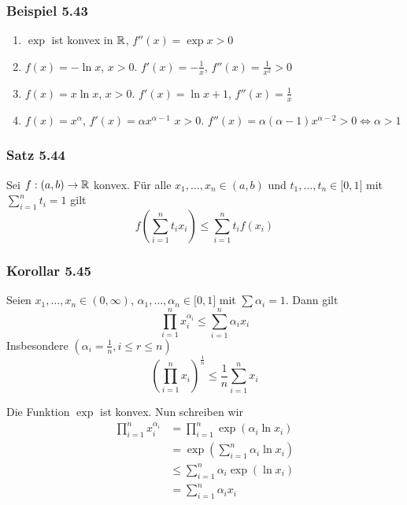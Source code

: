 \subsubsection*{Beispiel 5.43}
\begin{enumerate}
\item $\exp$ ist konvex in $\mathbb{R}$, $f''(x)=\exp x>0$
\item $f(x)=-\ln x$, $x>0$. $f'(x)=-\frac{1}{x}$, $f''(x)=\frac{1}{x^2}>0$
\item $f(x)=x\ln x$, $x>0$. $f'(x)=\ln x +1$, $f''(x)=\frac{1}{x}$
\item $f(x)=x^\alpha $, $f'(x)=\alpha x^{\alpha-1}$ $x>0$. $f''(x)=\alpha(\alpha-1)x^{\alpha-2}>0\Leftrightarrow \alpha >1$
\end{enumerate}

\subsubsection*{Satz 5.44}
Sei $f:(a,b)\to\mathbb{R}$ konvex. Für alle $x_1,\dots,x_n\in(a,b)$ und $t_1,\dots,t_n\in\lbrack 0,1\rbrack$ mit $\sum\limits_{i=1}^n t_i=1$ gilt
\[f\left( \sum\limits_{i=1}^n t_ix_i\right)\leq  \sum\limits_{i=1}^n t_if(x_i)\]

\subsubsection*{Korollar 5.45}
Seien $x_1,\dots, x_n\in (0,\infty)$, $\alpha_1,\dots,\alpha_n\in\lbrack 0,1\rbrack$ mit $\sum\alpha_i=1$. Dann gilt 
\[\prod\limits_{i = 1}^n {x_i^{{\alpha _i}}}  \le \sum\limits_{i = 1}^n {{\alpha _i}{x_i}} \]
Insbesondere $\left( \alpha_i=\frac{1}{n}, i\leq r\leq n\right)$
\[{\left( {\prod\limits_{i = 1}^n {{x_i}} } \right)^{\frac{1}{n}}} \le \frac{1}{n}\sum\limits_{i = 1}^n {{x_i}} \]

\begin{beweis}{}
Die Funktion $\exp$ ist konvex. Nun schreiben wir
\begin{align*}
\prod\limits_{i = 1}^n {x_i^{{\alpha _i}}}  &= \prod\limits_{i = 1}^n {\exp ({\alpha _i}\ln {x_i})} \\
&=\exp\left( \sum\limits_{i=1}^n \alpha_i \ln x_i\right)\\
&\leq \sum\limits_{i=1}^n \alpha_i \exp\left(\ln x_i\right)\\
&=\sum\limits_{i=1}^n\alpha_i x_i
\end{align*}
\end{beweis}

